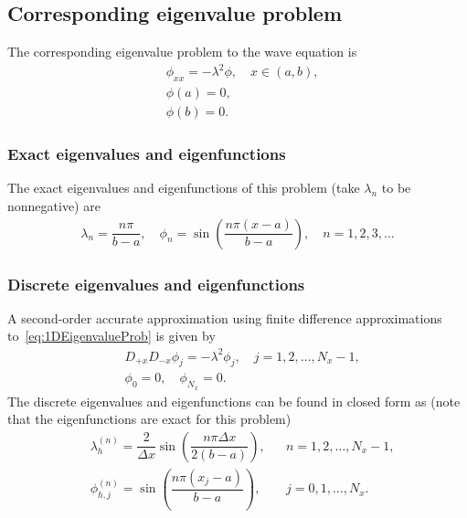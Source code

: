\documentclass[11pt]{article}
\begin{document}
\subsection{Corresponding eigenvalue problem}
The corresponding eigenvalue problem to the wave equation is
\begin{subequations}
\label{eq:1DEigenvalueProb}
\begin{align}
& \phi_{xx} = -\lambda^2 \phi, \quad x\in (a,b), \\
& \phi(a) = 0, \\
& \phi(b) = 0.
\end{align}
\end{subequations}
\subsubsection{Exact eigenvalues and eigenfunctions}
The exact eigenvalues and eigenfunctions of this problem (take $\lambda_n$ to be nonnegative) are 
\begin{subequations}
\begin{align}
\lambda_n = \dfrac{n\pi}{b-a}, \quad \phi_n = \sin\left( \dfrac{n\pi(x-a)}{b-a} \right), \quad n=1,2,3,\dots
\end{align}
\end{subequations}
\subsubsection{Discrete eigenvalues and eigenfunctions}
A second-order accurate approximation using finite difference approximations to~\eqref{eq:1DEigenvalueProb} is given by
\begin{subequations}
\begin{align}
& D_{+x}D_{-x}\phi_j = -\lambda^2 \phi_j, \quad j=1,2,\dots, N_x-1, \\
& \phi_0 = 0, \quad \phi_{N_x} = 0.
\end{align}
\end{subequations}
The discrete eigenvalues and eigenfunctions can be found in closed form as (note that the eigenfunctions are exact for this problem)
\begin{subequations}
\begin{align}
& \lambda^{(n)}_{h} =\dfrac{2}{\Delta x} \sin\left( \dfrac{n\pi \Delta x}{2(b-a)} \right), && n=1,2,\dots,N_x-1,
\\
&\phi^{(n)}_{h,j} = \sin\left( \dfrac{n\pi(x_j-a)}{b-a} \right), && j=0,1,\dots ,N_x. 
\end{align}
\end{subequations}
\end{document}
